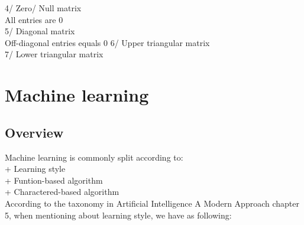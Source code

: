 \documentclass[12pt,a4paper]{article}
\begin{document}
4/ Zero/ Null matrix\\
All entries are 0\\

5/ Diagonal matrix\\
Off-diagonal entries equals 0
6/ Upper triangular matrix\\
7/ Lower triangular matrix\\
\newpage
\section{Machine learning}
\subsection{Overview}	%
Machine learning is commonly split according to:\\
\indent+ Learning style\\
\indent+ Funtion-based algorithm\\
\indent+ Charactered-based algorithm\\
\noindent
According to the taxonomy in Artificial Intelligence A Modern Approach chapter 5, when mentioning about learning style, we have as following:\\
\end{document}
